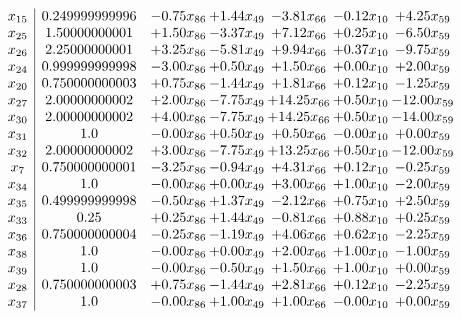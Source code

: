 \documentclass[8pt]{article}
\begin{document}
\[\begin{array}{c| c c@{\hskip 2pt} c@{\hskip 2pt} c@{\hskip 2pt} c@{\hskip 2pt} c@{\hskip 2pt} }
 x_{15}   &  0.249999999996 & -0.75 x_{86} & +  1.44 x_{49} & -3.81 x_{66} & -0.12 x_{10} & +  4.25 x_{59}\\
 x_{25}   &  1.50000000001 & +  1.50 x_{86} & -3.37 x_{49} & +  7.12 x_{66} & +  0.25 x_{10} & -6.50 x_{59}\\
 x_{26}   &  2.25000000001 & +  3.25 x_{86} & -5.81 x_{49} & +  9.94 x_{66} & +  0.37 x_{10} & -9.75 x_{59}\\
 x_{24}   &  0.999999999998 & -3.00 x_{86} & +  0.50 x_{49} & +  1.50 x_{66} & +  0.00 x_{10} & +  2.00 x_{59}\\
 x_{20}   &  0.750000000003 & +  0.75 x_{86} & -1.44 x_{49} & +  1.81 x_{66} & +  0.12 x_{10} & -1.25 x_{59}\\
 x_{27}   &  2.00000000002 & +  2.00 x_{86} & -7.75 x_{49} & + 14.25 x_{66} & +  0.50 x_{10} & -12.00 x_{59}\\
 x_{30}   &  2.00000000002 & +  4.00 x_{86} & -7.75 x_{49} & + 14.25 x_{66} & +  0.50 x_{10} & -14.00 x_{59}\\
 x_{31}   &  1.0 & -0.00 x_{86} & +  0.50 x_{49} & +  0.50 x_{66} & -0.00 x_{10} & +  0.00 x_{59}\\
 x_{32}   &  2.00000000002 & +  3.00 x_{86} & -7.75 x_{49} & + 13.25 x_{66} & +  0.50 x_{10} & -12.00 x_{59}\\
 x_{7}   &  0.750000000001 & -3.25 x_{86} & -0.94 x_{49} & +  4.31 x_{66} & +  0.12 x_{10} & -0.25 x_{59}\\
 x_{34}   &  1.0 & -0.00 x_{86} & +  0.00 x_{49} & +  3.00 x_{66} & +  1.00 x_{10} & -2.00 x_{59}\\
 x_{35}   &  0.499999999998 & -0.50 x_{86} & +  1.37 x_{49} & -2.12 x_{66} & +  0.75 x_{10} & +  2.50 x_{59}\\
 x_{33}   &  0.25 & +  0.25 x_{86} & +  1.44 x_{49} & -0.81 x_{66} & +  0.88 x_{10} & +  0.25 x_{59}\\
 x_{36}   &  0.750000000004 & -0.25 x_{86} & -1.19 x_{49} & +  4.06 x_{66} & +  0.62 x_{10} & -2.25 x_{59}\\
 x_{38}   &  1.0 & -0.00 x_{86} & +  0.00 x_{49} & +  2.00 x_{66} & +  1.00 x_{10} & -1.00 x_{59}\\
 x_{39}   &  1.0 & -0.00 x_{86} & -0.50 x_{49} & +  1.50 x_{66} & +  1.00 x_{10} & +  0.00 x_{59}\\
 x_{28}   &  0.750000000003 & +  0.75 x_{86} & -1.44 x_{49} & +  2.81 x_{66} & +  0.12 x_{10} & -2.25 x_{59}\\
 x_{37}   &  1.0 & -0.00 x_{86} & +  1.00 x_{49} & +  1.00 x_{66} & -0.00 x_{10} & +  0.00 x_{59}\\

\end{array}\]
\end{document}

